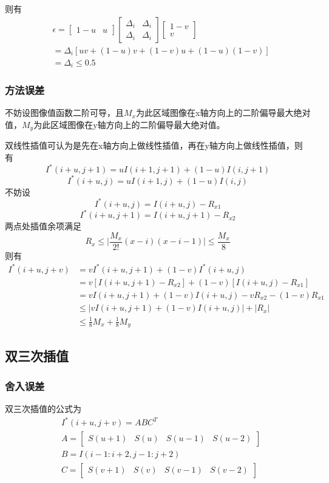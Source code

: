 \documentclass[11pt,a4paper]{ctexart}
\begin{document}
则有
\begin{align*}
&\epsilon =
\begin{bmatrix}
    1-u & u
\end{bmatrix}
\begin{bmatrix}
    \Delta_i & \Delta_i \\
    \Delta_i & \Delta_i
\end{bmatrix}
\begin{bmatrix}
    1-v \\
    v
\end{bmatrix} \\
&= \Delta_i [uv + (1-u)v + (1-v)u + (1-u)(1-v)] \\
&= \Delta_i \le 0.5
\end{align*}

\subsubsection{方法误差}
不妨设图像值函数二阶可导，且$M_x$为此区域图像在x轴方向上的二阶偏导最大绝对值，$M_y$为此区域图像在y轴方向上的二阶偏导最大绝对值。

双线性插值可认为是先在x轴方向上做线性插值，再在y轴方向上做线性插值，则有
$$I^*(i + u, j + 1) = uI(i + 1, j + 1) + (1 - u)I(i, j + 1)$$
$$I^*(i + u, j) = uI(i + 1, j) + (1 - u)I(i, j)$$
不妨设
$$I^*(i + u, j) = I(i + u, j) - R_{x1}$$
$$I^*(i + u, j + 1) = I(i + u, j + 1) - R_{x2}$$
两点处插值余项满足
$$R_x \le \lvert \dfrac{M_x}{2!} (x - i)(x - i - 1)\rvert \le \dfrac{M_x}{8}$$
则有
\begin{align*}
I^*(i + u, j + v) &= v I^*(i + u, j + 1) + (1 - v) I^*(i + u, j)\\
&= v\left[ I(i + u, j + 1) - R_{x2} \right] + (1 - v)\left[ I(i + u, j) - R_{x1} \right]\\
&= vI(i + u, j + 1) + (1 - v)I(i + u, j) - vR_{x2} - (1 - v)R_{x1}\\
&\le \lvert vI(i + u, j + 1) + (1 - v)I(i + u, j) \rvert + \lvert R_x \rvert\\
&\le \frac{1}{8}M_x + \frac{1}{8}M_y
\end{align*}

\subsection{双三次插值}
\subsubsection{舍入误差}
双三次插值的公式为
\begin{align*}
    &I^*(i + u, j + v) = ABC^T \\
    &A = 
    \begin{bmatrix}
        S(u + 1) & S(u) & S(u - 1) & S(u - 2)
    \end{bmatrix}\\
    &B = I(i-1:i+2, j-1:j+2)\\
    &C = 
    \begin{bmatrix}
        S(v + 1) & S(v) & S(v - 1) & S(v - 2)
    \end{bmatrix}
\end{align*}
\end{document}

